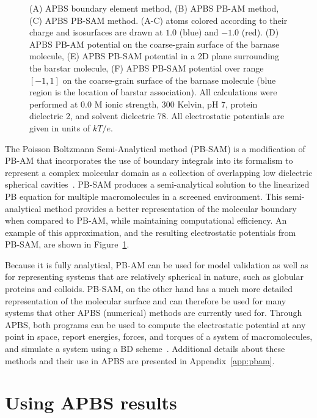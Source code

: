 \documentclass[12pt,titlepage]{article}
\begin{document}
\begin{figure}
{{		(A) APBS boundary element method,
		(B) APBS PB-AM method, 
		(C) APBS PB-SAM method. (A-C) atoms colored according to their charge and isosurfaces are drawn at $1.0$ (blue) and $-1.0$ (red).
		(D) APBS PB-AM potential on the coarse-grain surface of the barnase molecule, 
		(E) APBS PB-SAM potential in a 2D plane surrounding the barstar molecule,
		(F) APBS PB-SAM potential over range $[-1, 1]$ on the coarse-grain surface of the barnase molecule (blue region is the location of barstar association).
		All calculations were performed at 0.0 M ionic strength, 300 Kelvin, pH 7, protein dielectric 2, and solvent dielectric 78.
		All electrostatic potentials are given in units of $kT/e$.}
	}
	\label{fig:pbsam-results}
\end{figure}

The Poisson Boltzmann Semi-Analytical method (PB-SAM) is a modification of PB-AM that incorporates the use of boundary integrals into its formalism to represent a complex molecular domain as a collection of overlapping low dielectric spherical cavities~\cite{Yap2010}.
PB-SAM produces a semi-analytical solution to the linearized PB equation for multiple macromolecules in a screened environment.
This semi-analytical method provides a better representation of the molecular boundary when compared to PB-AM, while maintaining computational efficiency.
An example of this approximation, and the resulting electrostatic potentials from PB-SAM, are shown in Figure~\ref{fig:pbsam-results}.

Because it is fully analytical, PB-AM can be used for model validation as well as for representing systems that are relatively spherical in nature, such as globular proteins and colloids.
PB-SAM, on the other hand has a much more detailed representation of the molecular surface and can therefore be used for many systems that other APBS (numerical) methods are currently used for. Through APBS, both programs can be used to compute the electrostatic potential at any point in space, report energies, forces, and torques of a system of macromolecules, and simulate a system using a BD scheme~\cite{Ermak1978}.
Additional details about these methods and their use in APBS are presented in Appendix~\ref{app:pbam}.

\section{Using APBS results}
\end{document}
